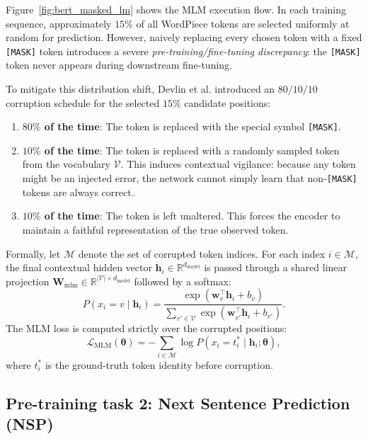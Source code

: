 \documentclass[../../../main.tex]{subfiles}
\begin{document}
Figure~\ref{fig:bert_masked_lm} shows the MLM execution flow. In each training sequence, approximately $15\%$ of all WordPiece tokens are selected uniformly at random for prediction. However, naively replacing every chosen token with a fixed \texttt{[MASK]} token introduces a severe \emph{pre-training/fine-tuning discrepancy}: the \texttt{[MASK]} token never appears during downstream fine-tuning.

To mitigate this distribution shift, Devlin et al. introduced an $80/10/10$ corruption schedule for the selected $15\%$ candidate positions:
\begin{enumerate}
    \item \textbf{$80\%$ of the time}: The token is replaced with the special symbol \texttt{[MASK]}.
    \item \textbf{$10\%$ of the time}: The token is replaced with a randomly sampled token from the vocabulary $\mathcal{V}$. This induces contextual vigilance: because any token might be an injected error, the network cannot simply learn that non-\texttt{[MASK]} tokens are always correct.
    \item \textbf{$10\%$ of the time}: The token is left unaltered. This forces the encoder to maintain a faithful representation of the true observed token.
\end{enumerate}

Formally, let $\mathcal{M}$ denote the set of corrupted token indices. For each index $i \in \mathcal{M}$, the final contextual hidden vector $\mathbf{h}_i \in \mathbb{R}^{d_{\text{model}}}$ is passed through a shared linear projection $\mathbf{W}_{\text{mlm}} \in \mathbb{R}^{|\mathcal{V}| \times d_{\text{model}}}$ followed by a softmax:
\begin{equation}
P(x_i = v \mid \mathbf{h}_i) = \frac{\exp(\mathbf{w}_v^\top \mathbf{h}_i + b_v)}{\sum_{v' \in \mathcal{V}} \exp(\mathbf{w}_{v'}^\top \mathbf{h}_i + b_{v'})}.
\label{eq:bert_mlm_prediction_prob}
\end{equation}
The MLM loss is computed strictly over the corrupted positions:
\begin{equation}
\mathcal{L}_{\text{MLM}}(\boldsymbol{\theta}) = -\sum_{i \in \mathcal{M}} \log P(x_i = t_i^* \mid \mathbf{h}_i; \boldsymbol{\theta}),
\label{eq:bert_mlm_cross_entropy_loss}
\end{equation}
where $t_i^*$ is the ground-truth token identity before corruption.


\subsection{Pre-training task 2: Next Sentence Prediction (NSP)}
\label{subsec:bert_nsp}
\end{document}
